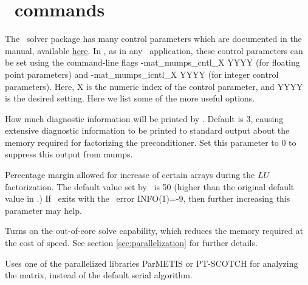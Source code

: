 \section{\mumps~commands}
\label{sec:mumpsControlParameters}

The \mumps~solver package has many control parameters which are documented in the manual,
available \href{http://mumps-solver.org/}{here}.
In \sfincs, as in any \PETSc~application, these control parameters can be set
using the command-line flags {\ttfamily -mat\_mumps\_cntl\_X YYYY} (for floating point parameters)
and {\ttfamily -mat\_mumps\_icntl\_X YYYY} (for integer control parameters). 
Here, {\ttfamily X} is the numeric index of the control parameter,
and {\ttfamily YYYY} is the desired setting.
Here we list some of the more useful options.\\

\myhrule

{How much diagnostic information will be printed by \mumps. Default is 3, causing extensive diagnostic information to be printed 
to standard output about the memory required for factorizing the preconditioner.
Set this parameter to 0 to suppress this output from mumps.}

\myhrule

{Percentage margin allowed for increase of certain arrays during the $LU$ factorization.
The default value set by \sfincs~is 50 (higher than the original default value in \mumps.)
If \sfincs~exits with the \mumps~error {\ttfamily INFO(1)=-9}, then further increasing this parameter may help.}

\myhrule

{Turns on the out-of-core solve capability,
which reduces the memory required at the cost of speed.
See section \ref{sec:parallelization} for further details.}

\myhrule

{Uses one of the parallelized libraries ParMETIS or PT-SCOTCH for analyzing the matrix,
instead of the default serial algorithm.}



